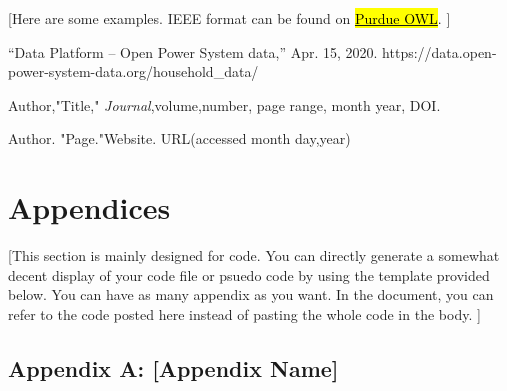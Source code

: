 \documentclass[letterpaper, 11pt]{article}
\begin{document}
 [Here are some examples. IEEE format can be found on \href{https://owl.purdue.edu/owl/research_and_citation/ieee_style/ieee_overview.html}{\hl{Purdue OWL}}. ]

\begin{thebibliography}{}

    “Data Platform – Open Power System data,” Apr. 15, 2020. https://data.open-power-system-data.org/household\_data/

    Author,"Title," \emph{Journal},volume,number, page range, month year, DOI.

    Author. "Page."Website. URL(accessed month day,year)

\end{thebibliography}

\clearpage
\section{Appendices}
 [This section is mainly designed for code. You can directly generate a somewhat decent display of your code file or psuedo code by using the template provided below. You can have as many appendix as you want. In the document, you can refer to the code posted here instead of pasting the whole code in the body. ]

\subsection{Appendix A: [Appendix Name]}

\end{document}
